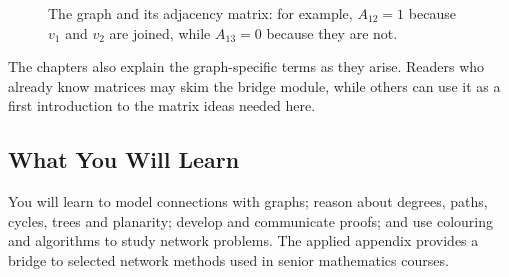 \begin{figure}[htbp]
\centering
{}
\caption{The graph and its adjacency matrix: for example, $A_{12}=1$ because $v_1$ and $v_2$ are joined, while $A_{13}=0$ because they are not.}
\end{figure}

The chapters also explain the graph-specific terms as they arise. Readers who already know matrices may skim the bridge module, while others can use it as a first introduction to the matrix ideas needed here.

\subsection*{What You Will Learn}
You will learn to model connections with graphs; reason about degrees, paths, cycles, trees and planarity; develop and communicate proofs; and use colouring and algorithms to study network problems. The applied appendix provides a bridge to selected network methods used in senior mathematics courses.
